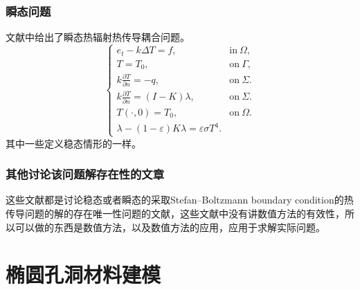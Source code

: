 \subsubsection{瞬态问题}
文献\cite{metzger1999existence}中给出了瞬态热辐射热传导耦合问题。
\begin{equation}
	\begin{cases}
		e_t - k \Delta T = f,                  &\text{in} \  \Omega, \\
		T = T_0, \qquad                    &\text{on} \  \Gamma,\\
		k \frac{\partial T}{\partial n} = -q, &\text{on} \  \Sigma.\\
		k \frac{\partial T}{\partial n} = (I-K)\lambda, &\text{on} \  \Sigma.\\
		T(\cdot,0)=T_0, & \text{on} \ \Omega. \\
		\lambda - (1-\varepsilon)K\lambda=\varepsilon\sigma T^4.
		
	\end{cases}
	\label{eq:timedepand}
\end{equation}
其中一些定义稳态情形的一样。

\subsubsection{其他讨论该问题解存在性的文章}
\cite{Qatanani2006149,Qatanani2004797,druet2009weak,klein2003transient}
\cite{qatanani2005error,qatanani2005analysis,druetnoncompactness,laitinen2002asymptotic}
\cite{Bermudeza201163,druet2010weak}

\begin{remark}
	 这些文献都是讨论稳态或者瞬态的采取Stefan–Boltzmann boundary condition的热传导问题的解的存在唯一性问题的文献，这些文献中没有讲数值方法的有效性，所以可以做的东西是数值方法，以及数值方法的应用，应用于求解实际问题。
\end{remark}

\section{椭圆孔洞材料建模}

